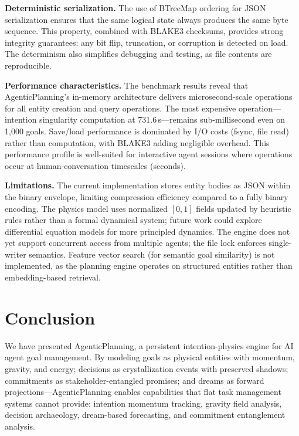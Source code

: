 \documentclass[10pt, twocolumn]{article}
\begin{document}
\textbf{Deterministic serialization.} The use of BTreeMap ordering for JSON serialization ensures that the same logical state always produces the same byte sequence. This property, combined with BLAKE3 checksums, provides strong integrity guarantees: any bit flip, truncation, or corruption is detected on load. The determinism also simplifies debugging and testing, as file contents are reproducible.

\textbf{Performance characteristics.} The benchmark results reveal that AgenticPlanning's in-memory architecture delivers microsecond-scale operations for all entity creation and query operations. The most expensive operation---intention singularity computation at 731.6\,\textmu s---remains sub-millisecond even on 1{,}000 goals. Save/load performance is dominated by I/O costs (fsync, file read) rather than computation, with BLAKE3 adding negligible overhead. This performance profile is well-suited for interactive agent sessions where operations occur at human-conversation timescales (seconds).

\textbf{Limitations.} The current implementation stores entity bodies as JSON within the binary envelope, limiting compression efficiency compared to a fully binary encoding. The physics model uses normalized $[0,1]$ fields updated by heuristic rules rather than a formal dynamical system; future work could explore differential equation models for more principled dynamics. The engine does not yet support concurrent access from multiple agents; the file lock enforces single-writer semantics. Feature vector search (for semantic goal similarity) is not implemented, as the planning engine operates on structured entities rather than embedding-based retrieval.


\section{Conclusion}
\label{sec:conclusion}

We have presented AgenticPlanning, a persistent intention-physics engine for AI agent goal management. By modeling goals as physical entities with momentum, gravity, and energy; decisions as crystallization events with preserved shadows; commitments as stakeholder-entangled promises; and dreams as forward projections---AgenticPlanning enables capabilities that flat task management systems cannot provide: intention momentum tracking, gravity field analysis, decision archaeology, dream-based forecasting, and commitment entanglement analysis.
\end{document}
